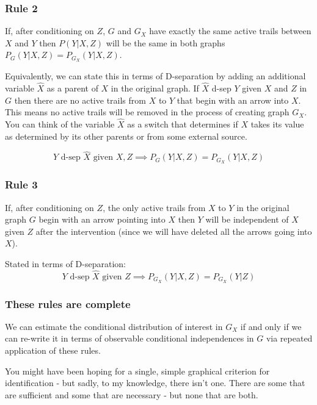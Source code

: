 \documentclass{article}
\begin{document}
\subsubsection*{Rule 2}
If, after conditioning on $Z$, $G$ and $G_X$ have exactly the same active trails between $X$ and $Y$ then $P(Y|X,Z)$ will be the same in both graphs $P_G(Y|X,Z) = P_{G_X}(Y|X,Z)$.
 
  
Equivalently, we can state this in terms of D-separation by adding an additional variable $\hat{X}$ as a parent of $X$ in the original graph. If $\hat{X}$ d-sep $Y$ given $X$ and $Z$ in $G$ then there are no active trails from $X$ to $Y$ that begin with an arrow into $X$. This means no active trails will be removed in the process of creating graph $G_X$. You can think of the variable $\hat{X}$ as a switch that determines if $X$ takes its value as determined by its other parents or from some external source. 

\begin{equation}
Y\text{ d-sep }\hat{X}\text{ given }X,Z \implies P_G(Y|X,Z) = P_{G_X}(Y|X,Z)
\end{equation}
 
\subsubsection*{Rule 3}
If, after conditioning on $Z$, the only active trails from $X$ to $Y$ in the original graph $G$ begin with an arrow pointing into $X$ then $Y$ will be independent of $X$ given $Z$ after the intervention (since we will have deleted all the arrows going into $X$). 

Stated in terms of D-separation:
\begin{equation}
Y \text{ d-sep } \hat{X} \text{ given } Z \implies P_{G_X}(Y|X,Z) = P_{G_X}(Y|Z)
\end{equation}



\subsubsection*{These rules are complete}
We can estimate the conditional distribution of interest in $G_X$ if and only if we can re-write it in terms of observable conditional independences in $G$ via repeated application of these rules.

You might have been hoping for a single, simple graphical criterion for identification - but sadly, to my knowledge, there isn't one. There are some that are sufficient and some that are necessary - but none that are both.
\end{document}
